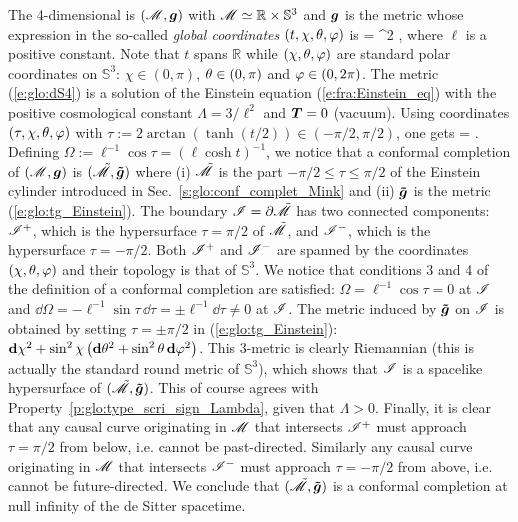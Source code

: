 \begin{example}
The 4-dimensional  is
$(\mathscr{M},\bm{g})$ with $\mathscr{M}\simeq \mathbb{R}\times\mathbb{S}^3$ and $\bm{g}$ is the metric
whose expression in the so-called \emph{global coordinates}
$(t,\chi,\theta,\varphi)$ is
\be \label{e:glo:dS4}
     = \ell^2  ,
\ee
where $\ell$ is a positive constant. Note that $t$ spans $\mathbb{R}$
while $(\chi,\theta,\varphi)$ are standard polar coordinates on $\mathbb{S}^3$:
$\chi\in(0,\pi)$, $\theta\in(0,\pi)$ and $\varphi\in(0,2\pi)$.
 The metric (\ref{e:glo:dS4}) is a solution
of the Einstein equation (\ref{e:fra:Einstein_eq}) with
the positive cosmological constant $\Lambda = 3/\ell^2$
and $\bm{T}=0$ (vacuum). Using coordinates $(\tau,\chi,\theta,\varphi)$ with
$\tau := 2\arctan(\tanh(t/2)) \in (-\pi/2,\pi/2)$, one gets
\be
     =   .
\ee
Defining $\Omega := \ell^{-1}\cos\tau = (\ell\cosh t)^{-1}$, we notice that
a conformal completion of $(\mathscr{M},\bm{g})$ is $(\tilde{\mathscr{M}},\bm{\tilde{g}})$
where (i) $\tilde{\mathscr{M}}$ is the part $-\pi/2\leq \tau \leq \pi/2$ of the Einstein cylinder
introduced in Sec.~\ref{s:glo:conf_complet_Mink}
and (ii)  $\bm{\tilde{g}}$ is the metric (\ref{e:glo:tg_Einstein}).
The boundary $\mathscr{I} = \partial\tilde{\mathscr{M}}$ has two connected components:
$\mathscr{I}^+$, which is the hypersurface $\tau = \pi/2$ of $\tilde{\mathscr{M}}$, and
$\mathscr{I}^-$, which is the hypersurface $\tau = -\pi/2$.
Both $\mathscr{I}^+$ and $\mathscr{I}^-$ are spanned by the coordinates $(\chi,\theta,\varphi)$
and their topology is that of $\mathbb{S}^3$.
We notice that conditions 3 and 4 of the definition of a conformal completion
are satisfied: $\Omega = \ell^{-1} \cos\tau = 0$ at $\mathscr{I}$ and
$\dd\Omega = - \ell^{-1} \sin\tau\, \dd\tau = \pm \ell^{-1} \dd\tau \not = 0 $
at $\mathscr{I}$.
The metric induced by $\bm{\tilde{g}}$ on $\mathscr{I}$ is obtained by
setting $\tau=\pm\pi/2$ in (\ref{e:glo:tg_Einstein}):
$\mathbf{d} \chi^2 + \sin^2\chi \left( \mathbf{d}\theta^2 + \sin^2\theta \, \mathbf{d}\varphi^2 \right) $.
This 3-metric is clearly Riemannian (this is actually the standard round metric
of $\mathbb{S}^3$), which shows that $\mathscr{I}$ is a spacelike
hypersurface of $(\tilde{\mathscr{M}},\bm{\tilde{g}})$. This of course agrees with
Property~\ref{p:glo:type_scri_sign_Lambda}, given that $\Lambda > 0$.
Finally, it is clear that
any causal curve originating in $\mathscr{M}$ that intersects $\mathscr{I}^+$ must approach
$\tau=\pi/2$ from below, i.e. cannot be past-directed. Similarly any
causal curve originating in $\mathscr{M}$ that intersects $\mathscr{I}^-$ must approach
$\tau=-\pi/2$ from above, i.e. cannot be future-directed. We conclude
that $(\tilde{\mathscr{M}},\bm{\tilde{g}})$ is a conformal completion at null infinity
of the de Sitter spacetime.
\end{example}


